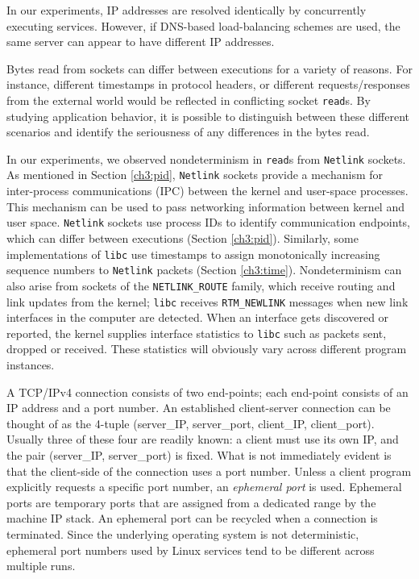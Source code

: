  \newline
In our experiments, IP addresses are resolved identically by concurrently executing services. 
However, if DNS-based load-balancing schemes are used, the same 
server can appear to have different IP addresses. \newline

 \newline
Bytes read from sockets can differ between
executions for a variety
of reasons. For instance, different timestamps in 
protocol headers, or different requests/responses 
from the external world would be reflected in
conflicting socket \texttt{read}s.
By studying application behavior, it is possible
to distinguish between 
these different scenarios and
identify the seriousness
of any differences in the bytes read.

In our experiments, we observed nondeterminism
in \texttt{read}s from \texttt{Netlink} sockets.
As mentioned in Section \ref{ch3:pid},
\texttt{Netlink} sockets provide a 
mechanism for inter-process communications (IPC)
between the kernel and user-space processes.
This mechanism can be used to pass
networking information between kernel
and user space. \texttt{Netlink} sockets
use process IDs to identify
communication endpoints, which can 
differ between executions (Section \ref{ch3:pid}).
Similarly, some implementations of \texttt{libc} use
timestamps to assign monotonically increasing sequence 
numbers to \texttt{Netlink} packets (Section \ref{ch3:time}).
Nondeterminism can also arise from sockets of the \texttt{NETLINK\_ROUTE}
family, which receive routing and link updates
from the kernel; \texttt{libc} receives \texttt{RTM\_NEWLINK}
messages when new link interfaces 
in the computer are detected. When an interface
gets discovered or reported, the kernel supplies
interface statistics to \texttt{libc} 
such as packets sent, dropped or
received. These statistics will obviously vary
across different program instances.  
\newline

 \newline
A TCP/IPv4 connection consists of two end-points;
each end-point consists of an IP address and a port
number. An established client-server connection 
can be thought of as the
4-tuple (server\_IP, server\_port, client\_IP, client\_port).
Usually three of these four are readily known:
a client must use its own IP, and
the pair (server\_IP, server\_port) is fixed. What is not
immediately evident is that the client-side of 
the connection uses a port number.
Unless a client program explicitly
requests a specific port number,
an {\em ephemeral port} is used.
Ephemeral ports are temporary ports that are
assigned from a dedicated range by the machine IP stack.
An ephemeral port can be recycled
when a connection is terminated.
Since the underlying operating system
is not deterministic, ephemeral
port numbers used by Linux services
tend to be different across multiple 
runs. 

